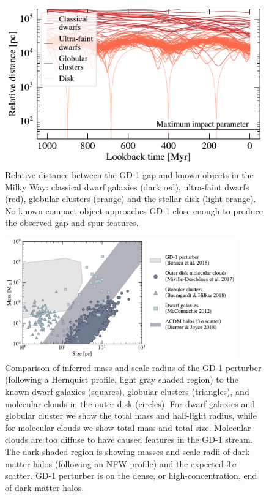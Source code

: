 \documentclass[twocolumn]{aastex62}
\begin{document}
\begin{figure}
\begin{center}
\includegraphics[width=\columnwidth]{satellite_distances.pdf}
\end{center}
\caption{Relative distance between the GD-1 gap and known objects in the Milky Way: classical dwarf galaxies (dark red), ultra-faint dwarfs (red), globular clusters (orange) and the stellar disk (light orange).
No known compact object approaches GD-1 close enough to produce the observed gap-and-spur features.
}
\label{fig:known_encounters}
\end{figure}

\begin{figure}
\begin{center}
\includegraphics[width=0.9\textwidth]{mass_size.pdf}
\end{center}
\caption{Comparison of inferred mass and scale radius of the GD-1 perturber (following a Hernquist profile, light gray shaded region) to the known dwarf galaxies (squares), globular clusters (triangles), and molecular clouds in the outer disk (circles).
For dwarf galaxies and globular cluster we show the total mass and half-light radius, while for molecular clouds we show total mass and total size.
Molecular clouds are too diffuse to have caused features in the GD-1 stream.
The dark shaded region is showing masses and scale radii of dark matter halos (following an NFW profile) and the expected $3\,\sigma$ scatter.
GD-1 perturber is on the dense, or high-concentration, end of dark matter halos.
}
\label{fig:mass_size}
\end{figure}
\end{document}
